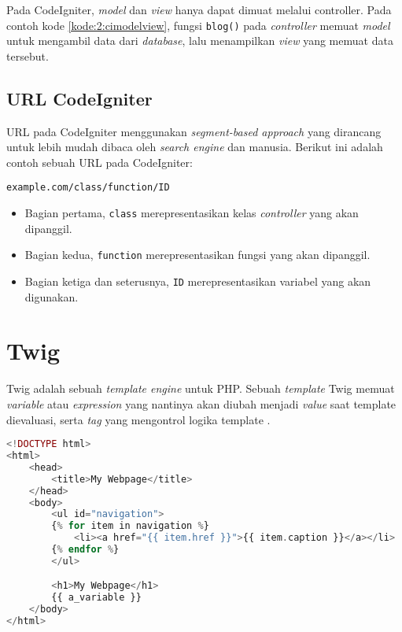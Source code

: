 Pada CodeIgniter, \textit{model} dan \textit{view} hanya dapat dimuat melalui controller. Pada contoh kode \ref{kode:2:cimodelview}, fungsi \verb|blog()| pada \textit{controller} memuat \textit{model} untuk mengambil data dari \textit{database}, lalu menampilkan \textit{view} yang memuat data tersebut. 

\subsection{URL CodeIgniter}
\label{subs:2:ciurl}

URL pada CodeIgniter menggunakan \textit{segment-based approach} yang dirancang untuk lebih mudah dibaca oleh \textit{search engine} dan manusia. Berikut ini adalah contoh sebuah URL pada CodeIgniter:
\begin{center}
    \verb|example.com/class/function/ID|    
\end{center}
\begin{itemize}
	\item Bagian pertama, \verb|class| merepresentasikan kelas \textit{controller} yang akan dipanggil.
	\item Bagian kedua,  \verb|function| merepresentasikan fungsi yang akan dipanggil.
	\item Bagian ketiga dan seterusnya, \verb|ID| merepresentasikan variabel yang akan digunakan.
\end{itemize}

\section{Twig}
\label{sec:2:twig}

Twig adalah sebuah \textit{template engine} untuk PHP. Sebuah \textit{template} Twig memuat \textit{variable} atau \textit{expression} yang nantinya akan diubah menjadi \textit{value} saat template dievaluasi, serta \textit{tag} yang mengontrol logika template \cite{twig}.

\begin{lstlisting}[language=php, caption=Contoh template Twig, label=kode:2:twig]
<!DOCTYPE html>
<html>
    <head>
        <title>My Webpage</title>
    </head>
    <body>
        <ul id="navigation">
        {% for item in navigation %}
            <li><a href="{{ item.href }}">{{ item.caption }}</a></li>
        {% endfor %}
        </ul>

        <h1>My Webpage</h1>
        {{ a_variable }}
    </body>
</html>
\end{lstlisting}

